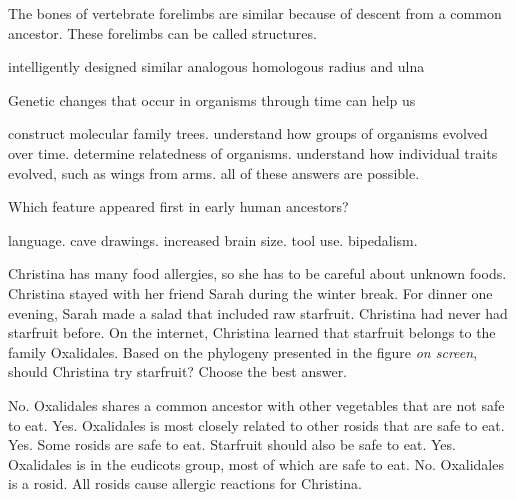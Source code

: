 

\question
The bones of vertebrate forelimbs are similar because of descent from a common ancestor. These forelimbs can be called \underline{\hspace{2cm}} structures.

\begin{choices}
\choice intelligently designed
\choice similar
\choice analogous
\correctchoice homologous
\choice radius and ulna
\end{choices}

\question
Genetic changes that occur in organisms through time can help us

\begin{choices}
\choice construct molecular family trees.
\choice understand how groups of organisms evolved over time.
\choice determine relatedness of organisms.
\choice understand how individual traits evolved, such as wings from arms.
\correctchoice all of these answers are possible.%
\end{choices}

\question
Which feature appeared first in early human ancestors?

\begin{choices}
\choice language.
\choice cave drawings.
\choice increased brain size.
\choice tool use.
\correctchoice bipedalism.
\end{choices}

\question
Christina has many food allergies, so she has to be careful about unknown foods.  Christina stayed with her friend Sarah during the winter break.  For dinner one evening, Sarah made a salad that included raw starfruit. Christina had never had starfruit before. On the internet, Christina learned that starfruit belongs to the family Oxalidales. Based on the phylogeny presented in the figure \textit{on screen}, should Christina try starfruit? Choose the best answer.

\begin{choices}
\correctchoice No. Oxalidales shares a common ancestor with other vegetables that are not safe to eat.
\choice Yes. Oxalidales is most closely related to other rosids that are safe to eat.
\choice Yes. Some rosids are safe to eat. Starfruit should also be safe to eat.
\choice Yes. Oxalidales is in the eudicots group, most of which are safe to eat.
\choice No. Oxalidales is a rosid. All rosids cause allergic reactions for Christina.
\end{choices}

